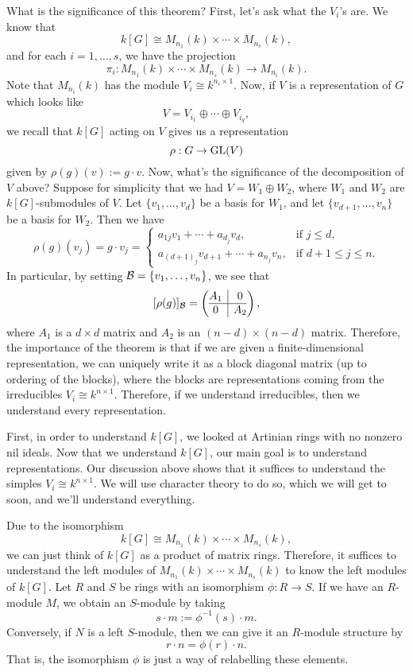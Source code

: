 What is the significance of this theorem? First, let's ask what the $V_i$'s are. 
We know that 
\[ k[G] \cong M_{n_1}(k) \times \cdots \times M_{n_s}(k), \] 
and for each $i = 1, \dots, s$, we have the projection 
\[ \pi_i : M_{n_1}(k) \times \cdots \times M_{n_s}(k) \to M_{n_i}(k). \] 
Note that $M_{n_i}(k)$ has the module $V_i \cong k^{n_i \times 1}$. Now, if 
$V$ is a representation of $G$ which looks like 
\[ V = V_{i_1} \oplus \cdots \oplus V_{i_q}, \] 
we recall that $k[G]$ acting on $V$ gives us a representation 
\[ \rho : G \to \operatorname{GL}(V) \] 
given by $\rho(g)(v) := g \cdot v$. Now, what's the significance of the 
decomposition of $V$ above? Suppose for simplicity that we had 
$V = W_1 \oplus W_2$, where $W_1$ and $W_2$ are $k[G]$-submodules of $V$. 
Let $\{v_1, \dots, v_d\}$ be a basis for $W_1$, and let 
$\{v_{d+1}, \dots, v_n\}$ be a basis for $W_2$. Then we have 
\[ \rho(g)(v_j) = g \cdot v_j = \begin{cases} 
    a_{1j}v_1 + \cdots + a_{d_j} v_d, & \text{if $j \leq d$,} \\ 
    a_{(d+1)_j} v_{d+1} + \cdots + a_{n_j} v_n, & \text{if $d + 1 \leq j \leq n$.}
\end{cases} \] 
In particular, by setting ${\cal B} = \{v_1, \dots, v_n\}$, we see that 
\[ [\rho(g)]_{\cal B} = \left(\begin{array}{@{}c|c@{}}
    A_1 & 0 \\\hline
    0 & A_2 
  \end{array}\right), \]
where $A_1$ is a $d \times d$ matrix and $A_2$ is an $(n-d) \times (n-d)$ matrix.
Therefore, the importance of the theorem is that if we are given a finite-dimensional 
representation, we can uniquely write it as a block diagonal matrix 
(up to ordering of the blocks), where the blocks are representations coming 
from the irreducibles $V_i \cong k^{n \times 1}$. Therefore, if we understand 
irreducibles, then we understand every representation. 

First, in order to understand $k[G]$, we looked at Artinian rings with no 
nonzero nil ideals. Now that we understand $k[G]$, our main goal is to understand 
representations. Our discussion above shows that it suffices to understand 
the simples $V_i \cong k^{n \times 1}$. We will use character theory to do so, 
which we will get to soon, and we'll understand everything. 

Due to the isomorphism 
\[ k[G] \cong M_{n_1}(k) \times \cdots \times M_{n_s}(k), \] 
we can just think of $k[G]$ as a product of matrix rings. Therefore, it suffices 
to understand the left modules of $M_{n_1}(k) \times \cdots \times 
M_{n_s}(k)$ to know the left modules of $k[G]$. Let $R$ and $S$ be rings 
with an isomorphism $\phi : R \to S$. If we have an $R$-module $M$, 
we obtain an $S$-module by taking 
\[ s \cdot m := \phi^{-1}(s) \cdot m. \] 
Conversely, if $N$ is a left $S$-module, then we can give it an $R$-module 
structure by 
\[ r \cdot n = \phi(r) \cdot n. \] 
That is, the isomorphism $\phi$ is just a way of relabelling these elements. 

